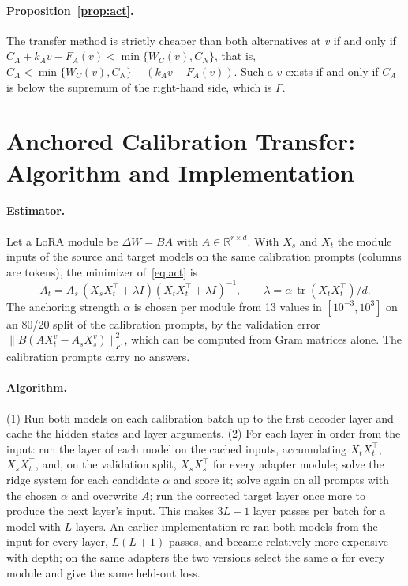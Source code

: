 \documentclass[preprint,12pt,authoryear]{elsarticle}
\begin{document}
\paragraph{Proposition~\ref{prop:act}.} The transfer method is strictly cheaper than both alternatives at $v$ if and only if $C_A+k_Av-F_A(v)<\min\{W_C(v),C_N\}$, that is, $C_A<\min\{W_C(v),C_N\}-(k_Av-F_A(v))$. Such a $v$ exists if and only if $C_A$ is below the supremum of the right-hand side, which is $\Gamma$.

\section{Anchored Calibration Transfer: Algorithm and Implementation}\label{app:act}

\paragraph{Estimator.} Let a LoRA module be $\Delta W=BA$ with $A\in\mathbb R^{r\times d}$. With $X_s$ and $X_t$ the module inputs of the source and target models on the same calibration prompts (columns are tokens), the minimizer of~\eqref{eq:act} is
\[
A_t=A_s\,(X_sX_t^{\top}+\lambda I)(X_tX_t^{\top}+\lambda I)^{-1},\qquad \lambda=\alpha\,\operatorname{tr}(X_tX_t^{\top})/d .
\]
The anchoring strength $\alpha$ is chosen per module from 13 values in $[10^{-3},10^{3}]$ on an 80/20 split of the calibration prompts, by the validation error $\|B(AX^v_t-A_sX^v_s)\|_F^2$, which can be computed from Gram matrices alone. The calibration prompts carry no answers.

\paragraph{Algorithm.} (1) Run both models on each calibration batch up to the first decoder layer and cache the hidden states and layer arguments. (2) For each layer in order from the input: run the layer of each model on the cached inputs, accumulating $X_tX_t^\top$, $X_sX_t^\top$, and, on the validation split, $X_sX_s^\top$ for every adapter module; solve the ridge system for each candidate $\alpha$ and score it; solve again on all prompts with the chosen $\alpha$ and overwrite $A$; run the corrected target layer once more to produce the next layer's input. This makes $3L-1$ layer passes per batch for a model with $L$ layers. An earlier implementation re-ran both models from the input for every layer, $L(L+1)$ passes, and became relatively more expensive with depth; on the same adapters the two versions select the same $\alpha$ for every module and give the same held-out loss.
\end{document}

